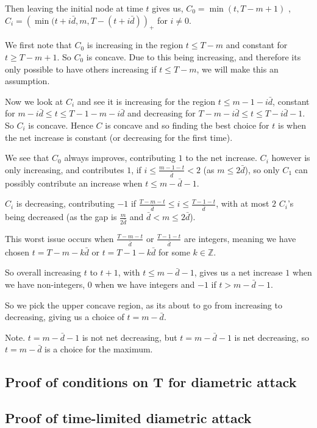 \documentclass[a4paper,10pt]{article}
\newcommand{\pospart}[1]{\left( #1 \right)_{+}}
\theoremstyle{definition}
\theoremstyle{definition}
\theoremstyle{remark}
\theoremstyle{definition}
\begin{document}
Then leaving the initial node at time $t$ gives us, $C_{0}=\min(t,T-m+1)$ , $C_{i}=\pospart{\min(t+i \bar{d},m,T-(t+i \bar{d})}$ for $i \neq 0$.

We first note that $C_{0}$ is increasing in the region $t \leq T-m$ and constant for $t \geq T-m+1$. So $C_{0}$ is concave. Due to this being increasing, and therefore its only possible to have others increasing if $t \leq T-m$, we will make this an assumption.

Now we look at $C_{i}$ and see it is increasing for the region $t \leq m-1-i\bar{d}$, constant for $m-i\bar{d} \leq t \leq T-1-m-i \bar{d}$ and decreasing for $ T-m-i \bar{d} \leq t \leq T-i \bar{d}-1$. So $C_{i}$ is concave. Hence $C$ is concave and so finding the best choice for $t$ is when the net increase is constant (or decreasing for the first time).

We see that $C_{0}$ always improves, contributing $1$ to the net increase. $C_{i}$ however is only increasing, and contributes $1$, if $i \leq \frac{m-1-t}{\bar{d}} < 2$ (as $m \leq 2\bar{d}$), so only $C_{1}$ can possibly contribute an increase when $t \leq m-\bar{d}-1$.

$C_{i}$ is decreasing, contributing $-1$ if $\frac{T-m-t}{\bar{d}} \leq i \leq \frac{T-1-t}{\bar{d}}$, with at most $2$ $C_{i}$'s being decreased (as the gap is $\frac{m}{2 \bar{d}}$ and $\bar{d} < m \leq 2 \bar{d}$).

This worst issue occurs when $\frac{T-m-t}{\bar{d}}$ or $\frac{T-1-t}{\bar{d}}$ are integers, meaning we have chosen $t=T-m-k\bar{d}$ or $t=T-1-k\bar{d}$ for some $k \in \mathbb{Z}$.

So overall increasing $t$ to $t+1$, with $t \leq m-\bar{d}-1$, gives us a net increase $1$ when we have non-integers, $0$ when we have integers  and $-1$ if $t > m- \bar{d}-1$.

So we pick the upper concave region, as its about to go from increasing to decreasing, giving us a choice of $t=m-\bar{d}$.
 
Note. $t=m-\bar{d}-1$ is not net decreasing, but $t=m-\bar{d}-1$ is net decreasing, so $t=m-\bar{d}$ is a choice for the maximum.

\subsection{Proof of conditions on T for diametric attack}
\label{Appendix:Proof of conditions on T for diametric attack}

\subsection{Proof of time-limited diametric attack}
\label{Appendix:Proof of time-limited diametric attack}
\end{document}
